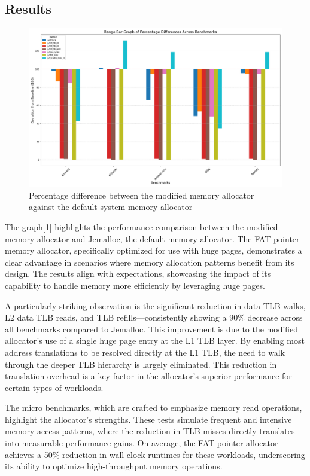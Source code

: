 \documentclass[11pt]{article}
\begin{document}
\subsection{Results}
\label{sec:orgf4cf5db}
\begin{figure}[htbp]
\centering
\includegraphics[width=.9\linewidth]{./diagrams/bargraph.png}
\caption{\label{fig:org876b3c0}Percentage difference between the modified memory allocator against the default system memory allocator}
\end{figure}


The graph[\ref{fig:org876b3c0}] highlights the performance comparison between the modified memory allocator and 
Jemalloc, the default memory allocator. The FAT pointer memory allocator, specifically optimized 
for use with huge pages, demonstrates a clear advantage in scenarios where memory allocation 
patterns benefit from its design. The results align with expectations, showcasing the impact 
of its capability to handle memory more efficiently by leveraging huge pages.

A particularly striking observation is the significant reduction in data TLB walks, 
L2 data TLB reads, and TLB refills—consistently showing a 90\% decrease across all 
benchmarks compared to Jemalloc. This improvement is due to the modified allocator's 
use of a single huge page entry at the L1 TLB layer. By enabling most address translations 
to be resolved directly at the L1 TLB, the need to walk through the deeper TLB hierarchy is 
largely eliminated. This reduction in translation overhead is a key factor in the allocator's 
superior performance for certain types of workloads.

The micro benchmarks, which are crafted to emphasize memory read operations, highlight the 
allocator's strengths. These tests simulate frequent and intensive memory access patterns, 
where the reduction in TLB misses directly translates into measurable performance gains. 
On average, the FAT pointer allocator achieves a 50\% reduction in wall clock runtimes for 
these workloads, underscoring its ability to optimize high-throughput memory operations.
\end{document}
